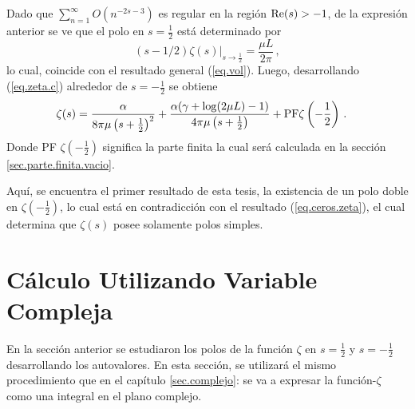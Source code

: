 Dado que $\sum _{n=1} ^{\infty} O \left( n ^{-2s-3} \right)$ es regular en la región  ${\rm Re }(s) > -1$, de la expresión anterior se ve que el polo en $s=  \frac{1}{2}$ está determinado por
\begin{equation}\label{eq.res.2}
    ( s-1/2 ) \zeta  (s) | _{s \rightarrow \frac{1}{2}} = 
    \frac{\mu L }{2 \pi}
    	\, ,
\end{equation}
lo cual, coincide con el resultado general (\ref{eq.vol}). Luego, desarrollando (\ref{eq.zeta.c}) alrededor de $s=-\frac{1}{2}$ se obtiene
\begin{align}\label{eq.res.1}
    &\zeta  (s) =  \frac{\alpha}{8  \pi \mu \left(s+\frac{1}{2} \right)^2} +
    \frac{ \alpha ( \gamma  +  \log (2\mu L ) -1 ) }
    	{4  \pi \mu \left(s+\frac{1}{2} \right) }  + 
	{\rm PF }\zeta \left(- \frac{1}{2} \right)
    	\, .
\end{align}
Donde PF $\zeta \left(- \frac{1}{2} \right)$ significa la parte finita la cual será calculada en la sección \ref{sec.parte.finita.vacio}.

Aquí, se encuentra el primer resultado de esta tesis, la existencia de un polo doble en $\zeta \left( -\frac{1}{2} \right)$, lo cual está en contradicción con el resultado (\ref{eq.ceros.zeta}), el cual determina que $\zeta (s)$ posee solamente polos simples.

\section{Cálculo Utilizando Variable Compleja}\label{seq.2.com}


En la sección anterior se estudiaron los polos de la función $\zeta$ en $s=\frac{1}{2}$ y $s=-\frac{1}{2}$ desarrollando los autovalores.
En esta sección, se utilizará el mismo procedimiento que en el capítulo \ref{sec.complejo}: se va a expresar la función-$\zeta $ como una integral en el plano complejo.

